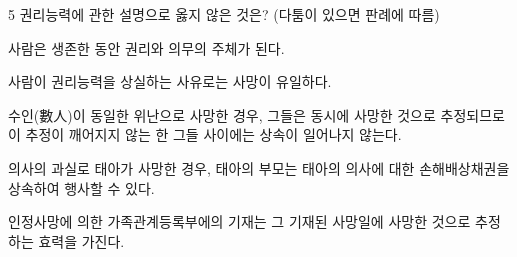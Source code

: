\begin{question}{5}
권리능력에 관한 설명으로 옳지 않은 것은? (다툼이 있으면 판례에 따름)
\begin{choices}
  \item 사람은 생존한 동안 권리와 의무의 주체가 된다.
  \item 사람이 권리능력을 상실하는 사유로는 사망이 유일하다.
  \item 수인(數人)이 동일한 위난으로 사망한 경우, 그들은 동시에 사망한 것으로 추정되므로 이 추정이 깨어지지 않는 한 그들 사이에는 상속이 일어나지 않는다.
  \item 의사의 과실로 태아가 사망한 경우, 태아의 부모는 태아의 의사에 대한 손해배상채권을 상속하여 행사할 수 있다.
  \item 인정사망에 의한 가족관계등록부에의 기재는 그 기재된 사망일에 사망한 것으로 추정하는 효력을 가진다.
\end{choices}
\end{question}
